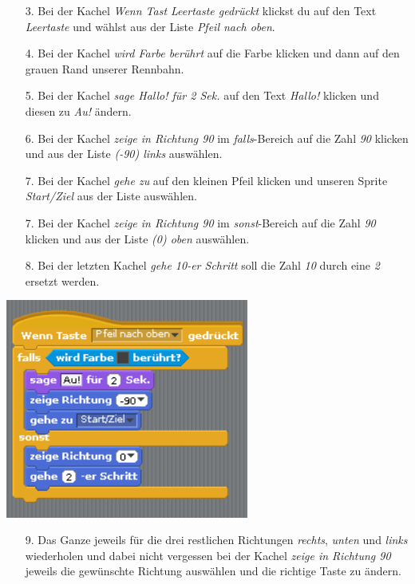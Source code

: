 \begin{itemize}
\item[3. ] Bei der Kachel \textit{Wenn Tast Leertaste gedrückt} klickst du auf den Text \textit{Leertaste} und w{\"a}hlst aus der Liste \textit{Pfeil nach oben}.
\item[4. ] Bei der Kachel \textit{wird Farbe berührt} auf die Farbe klicken und dann auf den grauen Rand unserer Rennbahn.
\item[5. ] Bei der Kachel \textit{sage Hallo! für 2 Sek.} auf den Text \textit{Hallo!} klicken und diesen zu \textit{Au!} ändern.
\item[6. ] Bei der Kachel \textit{zeige in Richtung 90} im \textit{falls}-Bereich auf die Zahl \textit{90} klicken und aus der Liste \textit{(-90) links} auswählen.
\item[7. ] Bei der Kachel \textit{gehe zu} auf den kleinen Pfeil klicken und unseren Sprite \textit{Start/Ziel} aus der Liste auswählen.
\item[7. ] Bei der Kachel \textit{zeige in Richtung 90} im \textit{sonst}-Bereich auf die Zahl \textit{90} klicken und aus der Liste \textit{(0) oben} auswählen.
\item[8. ] Bei der letzten Kachel \textit{gehe 10-er Schritt} soll die Zahl \textit{10} durch eine \textit{2} ersetzt werden.
\end{itemize}
\includegraphics[width=0.6\textwidth]{images/aufgabe4_bewege_katze_nach_oben.png}

\begin{itemize}
\item[9. ] Das Ganze jeweils für die drei restlichen Richtungen \textit{rechts}, \textit{unten} und \textit{links} wiederholen und dabei nicht vergessen bei der Kachel \textit{zeige in Richtung 90} jeweils die gewünschte Richtung auswählen und die richtige Taste zu ändern.
\end{itemize}


